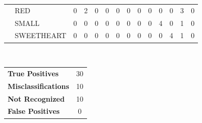 \documentclass[12pt]{article}
\begin{document}
\begin{table}[h]
\begin{tabular}{ll|c|c|c|c|c|c|c|c|c|c|c|c|}
\multicolumn{1}{|l}{}          & \multicolumn{1}{|l|}{RED}        & 0   & 2   & 0         & 0     & 0    & 0      & 0     & 0   & 0     & 0          & 3              & 0              \\ \cline{2-14} 
\multicolumn{1}{|l}{}          & \multicolumn{1}{|l|}{SMALL}      & 0   & 0   & 0         & 0     & 0    & 0      & 0     & 0   & 4     & 0          & 1              & 0              \\ \cline{2-14} 
\multicolumn{1}{|l}{}          & \multicolumn{1}{|l|}{SWEETHEART} & 0   & 0   & 0         & 0     & 0    & 0      & 0     & 0   & 0     & 4          & 1              & 0              \\ \hline
\end{tabular}
\\
\begin{tabular}{l c}

\textbf{True Positives} & 30 \\
\textbf{Misclassifications} & 10 \\
\textbf{Not Recognized} & 10 \\
\textbf{False Positives} & 0 \\

\end{tabular}
\end{table}

\newpage
\end{document}
